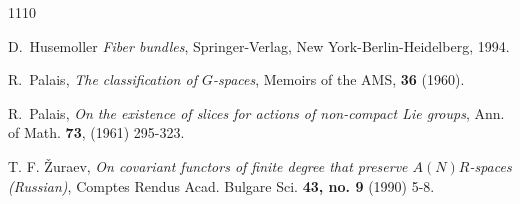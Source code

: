\documentclass{amsart}
\begin{document}
\begin{thebibliography}{1110}


 D.~Husemoller {\em  Fiber bundles},  Springer-Verlag, New York-Berlin-Heidelberg,
1994.





 R.~Palais, {\em  The classification of $G$-spaces}, Memoirs of the AMS, {\bf 36} (1960).

 R.~Palais,
{\em  On the existence of slices for actions of non-compact Lie groups},
Ann. of Math. {\bf  73}, (1961)  295-323.

  T. F. \v Zuraev, {\em On covariant functors of finite degree that preserve $A(N)R$-spaces (Russian)},  Comptes Rendus Acad. Bulgare Sci. {\bf 43, no. 9} (1990) 5-8.

\end{thebibliography}

\end{document}
